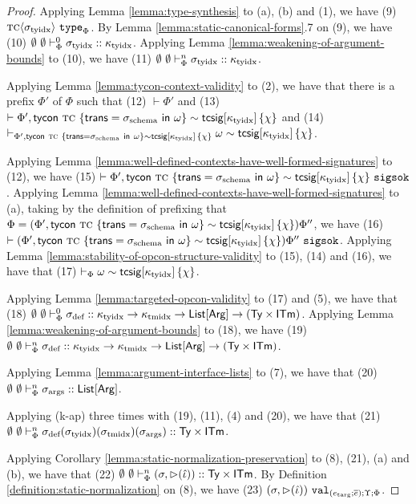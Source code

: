 \documentclass[12pt]{article}
\begin{document}
\begin{proof}
Applying Lemma \ref{lemma:type-synthesis} to (a), (b) and (1), we have (9) ${\textsc{tc}}\langle\sigma_\text{tyidx}\rangle~\mathtt{type}_{\Phi}$. By Lemma \ref{lemma:static-canonical-forms}.7 on (9), we have (10) $\emptyset~\emptyset \vdash_{\Phi}^{0} \sigma_\text{tyidx} :: \kappa_\text{tyidx}$. Applying Lemma \ref{lemma:weakening-of-argument-bounds} to (10), we have (11) $\emptyset~\emptyset \vdash_{\Phi}^{n} \sigma_\text{tyidx} :: \kappa_\text{tyidx}$.

Applying Lemma \ref{lemma:tycon-context-validity} to (2), we have that there is a prefix $\Phi'$ of $\Phi$ such that (12) $\vdash \Phi'$ and (13) $\vdash \Phi', {\sf tycon}~\textsc{tc} ~\{{\sf trans}=\sigma_\text{schema}~{\sf in}~\omega\} \sim {\sf tcsig}[\kappa_\text{tyidx}]\,\{\chi\}$ and (14) $\vdash_{\Phi', {\sf tycon}~\textsc{tc} ~\{{\sf trans}=\sigma_\text{schema}~{\sf in}~\omega\} \sim {\sf tcsig}[\kappa_\text{tyidx}]\,\{\chi\}} \omega \sim {\sf tcsig}[\kappa_\text{tyidx}]\,\{\chi\}$.

Applying Lemma \ref{lemma:well-defined-contexts-have-well-formed-signatures} to (12), we have (15) $\vdash \Phi', {\sf tycon}~\textsc{tc} ~\{{\sf trans}=\sigma_\text{schema}~{\sf in}~\omega\} \sim {\sf tcsig}[\kappa_\text{tyidx}]\,\{\chi\}~\mathtt{sigsok}$. Applying Lemma \ref{lemma:well-defined-contexts-have-well-formed-signatures} to (a), taking by the definition of prefixing that $\Phi=(\Phi', {\sf tycon}~\textsc{tc} ~\{{\sf trans}=\sigma_\text{schema}~{\sf in}~\omega\} \sim {\sf tcsig}[\kappa_\text{tyidx}]\,\{\chi\})\Phi''$, we have (16) $\vdash (\Phi', {\sf tycon}~\textsc{tc} ~\{{\sf trans}=\sigma_\text{schema}~{\sf in}~\omega\} \sim {\sf tcsig}[\kappa_\text{tyidx}]\,\{\chi\})\Phi''~\mathtt{sigsok}$. Applying Lemma \ref{lemma:stability-of-opcon-structure-validity} to (15), (14) and (16), we have that (17) $\vdash_{\Phi} \omega \sim {\sf tcsig}[\kappa_\text{tyidx}]\,\{\chi\}$.


Applying Lemma \ref{lemma:targeted-opcon-validity} to (17) and (5), we have that (18) $\emptyset~\emptyset \vdash_{\Phi}^{0} \sigma_\text{def} :: \kappa_\text{tyidx} \rightarrow \kappa_\text{tmidx} \rightarrow {\sf List}[{\sf Arg}] \rightarrow ({\sf Ty} \times {\sf ITm})$. Applying Lemma \ref{lemma:weakening-of-argument-bounds} to (18), we have (19) $\emptyset~\emptyset \vdash_{\Phi}^{n} \sigma_\text{def} :: \kappa_\text{tyidx} \rightarrow \kappa_\text{tmidx} \rightarrow {\sf List}[{\sf Arg}] \rightarrow ({\sf Ty} \times {\sf ITm})$.

Applying Lemma \ref{lemma:argument-interface-lists} to (7), we have that (20) $\emptyset~\emptyset \vdash_{\Phi}^{n} \sigma_\text{args} :: {\sf List}[{\sf Arg}]$. 

Applying (k-ap) three times with (19), (11), (4) and (20), we have that (21) $\emptyset~\emptyset \vdash_{\Phi}^{n} \sigma_\text{def}(\sigma_\text{tyidx})(\sigma_\text{tmidx})(\sigma_\text{args}) :: {\sf Ty}\times{\sf ITm}$. 

Applying Corollary \ref{lemma:static-normalization-preservation} to (8), (21), (a) and (b), we have that (22) $\emptyset~\emptyset \vdash_{\Phi}^{n} (\sigma, {\rhd}(\hat{\iota})) :: {\sf Ty}\times{\sf ITm}$. By Definition \ref{definition:static-normalization} on (8), we have (23) $(\sigma, {\rhd}(\hat{\iota}))~\mathtt{val}_{(e_\text{targ}; \overline{e}); \Upsilon; \Phi}$. 


\end{proof}
\end{document}
